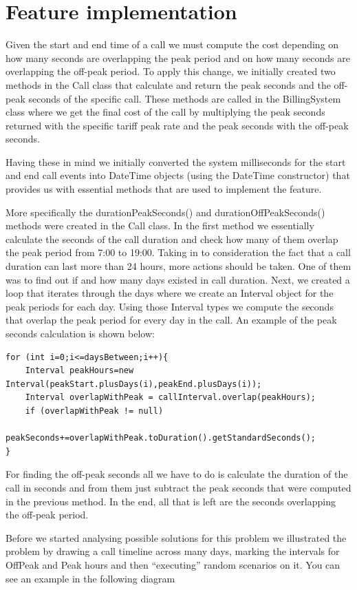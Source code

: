 \section{Feature implementation}
Given the start and end time of a call we must compute the cost depending on how many seconds are overlapping the peak period and on how many seconds are overlapping the off-peak period. To apply this change, we initially created two methods in the Call class that calculate and return the peak seconds and the off-peak seconds of the specific call. These methods are called in the BillingSystem class where we get the final cost of the call by multiplying the peak seconds returned with the specific tariff peak rate and the peak seconds with the off-peak seconds.

Having these in mind we initially converted the system milliseconds for the start and end call events into DateTime objects (using the DateTime constructor) that provides us with essential methods that are used to implement the feature.

More specifically the durationPeakSeconds() and  durationOffPeakSeconds() methods were created in the Call class. In the first method we essentially calculate the seconds of the call duration and check how many of them overlap the peak period from 7:00 to 19:00. Taking in to consideration the fact that a call duration can last more than 24 hours, more actions should be taken. One of them was to find out if and how many days existed in call duration. Next, we created a loop that iterates through the days where we create an Interval object for the peak periods for each day. Using those Interval types we compute the seconds that overlap the peak period for every day in the call. An example of the peak seconds calculation is shown below:

\begin{lstlisting}
for (int i=0;i<=daysBetween;i++){
	Interval peakHours=new Interval(peakStart.plusDays(i),peakEnd.plusDays(i));
	Interval overlapWithPeak = callInterval.overlap(peakHours);
	if (overlapWithPeak != null)
		peakSeconds+=overlapWithPeak.toDuration().getStandardSeconds();
}
\end{lstlisting}

For finding the off-peak seconds all we have to do is calculate the duration of the call in seconds and from them just subtract the peak seconds that were computed in the previous method. In the end, all that is left are the seconds overlapping the off-peak period.

Before we started analysing possible solutions for this problem we illustrated the problem by drawing a call timeline across many days, marking the intervals for OffPeak and Peak hours and then “executing” random scenarios on it. You can see an example in the following diagram

